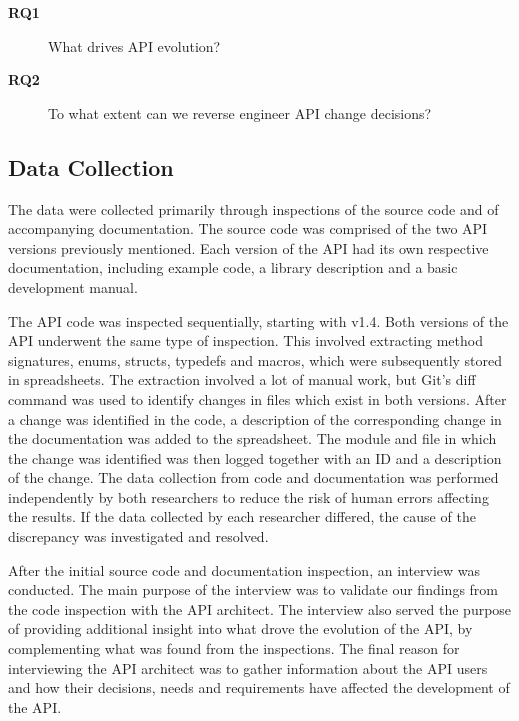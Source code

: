 \documentclass{sig-alternate}
\begin{document}
\begin{description}
\item[\textbf{RQ1}] What drives API evolution?
\item[\textbf{RQ2}] To what extent can we reverse engineer API change decisions?
\end{description}

 


\subsection{Data Collection} \label{data_collection}  
The data were collected primarily through inspections of the source code and of accompanying documentation. The source code was comprised of the two API versions previously mentioned. Each version of the API had its own respective documentation, including example code, a library description and a basic development manual. 

The API code was inspected sequentially, starting with v1.4. Both versions of the API underwent the same type of inspection. This involved extracting method signatures, enums, structs, typedefs and macros, which were subsequently stored in spreadsheets. The extraction involved a lot of manual work, but Git's \cite{git} diff command was used to identify changes in files which exist in both versions. After a change was identified in the code, a description of the corresponding change in the documentation was added to the spreadsheet. The module and file in which the change was identified was then logged together with an ID and a description of the change. The data collection from code and documentation was performed independently by both researchers to reduce the risk of human errors affecting the results. If the data collected by each researcher differed, the cause of the discrepancy was investigated and resolved. 

After the initial source code and documentation inspection, an interview was conducted. The main purpose of the interview was to validate our findings from the code inspection with the API architect. The interview also served the purpose of providing additional insight into what drove the evolution of the API, by complementing what was found from the inspections. The final reason for interviewing the API architect was to gather information about the API users and how their decisions, needs and requirements have affected the development of the API. 
\end{document}
